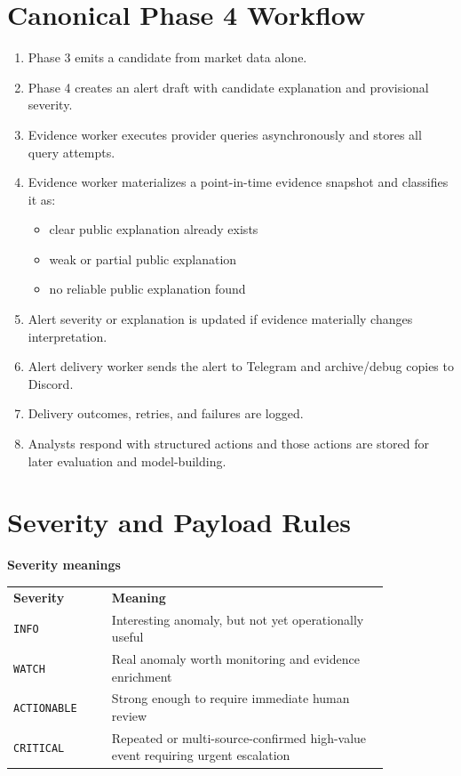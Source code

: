 \documentclass{article}
\begin{document}
\section*{Canonical Phase 4 Workflow}
\begin{enumerate}
\item Phase 3 emits a candidate from market data alone.
\item Phase 4 creates an alert draft with candidate explanation and provisional severity.
\item Evidence worker executes provider queries asynchronously and stores all query attempts.
\item Evidence worker materializes a point-in-time evidence snapshot and classifies it as:
\begin{itemize}
\item clear public explanation already exists
\item weak or partial public explanation
\item no reliable public explanation found
\end{itemize}
\item Alert severity or explanation is updated if evidence materially changes interpretation.
\item Alert delivery worker sends the alert to Telegram and archive/debug copies to Discord.
\item Delivery outcomes, retries, and failures are logged.
\item Analysts respond with structured actions and those actions are stored for later evaluation and model-building.
\end{enumerate}

\section*{Severity and Payload Rules}
\textbf{Severity meanings}
\begin{longtable}{p{0.22\linewidth}p{0.62\linewidth}}
\textbf{Severity} & \textbf{Meaning} \\
\texttt{INFO} & Interesting anomaly, but not yet operationally useful \\
\texttt{WATCH} & Real anomaly worth monitoring and evidence enrichment \\
\texttt{ACTIONABLE} & Strong enough to require immediate human review \\
\texttt{CRITICAL} & Repeated or multi-source-confirmed high-value event requiring urgent escalation \\
\end{longtable}
\end{document}
